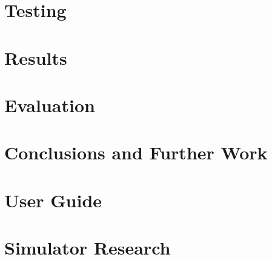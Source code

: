 \documentclass[11pt,a4paper,twoside,openright]{report}
\begin{document}
\chapter{Testing}
%


\chapter{Results}




\chapter{Evaluation}
%


\chapter{Conclusions and Further Work}
%


\chapter{User Guide}



\newpage



\appendix
\chapter{Simulator Research}

\end{document}
